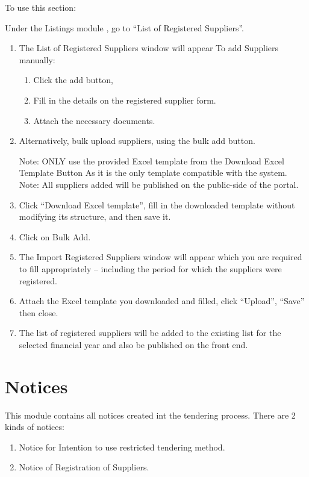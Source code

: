 \documentclass [12pt]{book}
\begin{document}
\begin{enumerate}
\begin{enumerate}
To use this section:

Under the Listings module , go to “List of Registered Suppliers”.
\begin{enumerate}
    \item The List of Registered Suppliers window will appear 
    To add Suppliers manually: 
    \begin{enumerate}
        \item Click the add button,
        \item Fill in the details on the registered supplier form.
        \item Attach the necessary documents.
    \end{enumerate}
    
    \item Alternatively, bulk upload suppliers, using the bulk add button.

    
    Note: ONLY use the provided Excel template from the Download Excel Template Button As it is the only template compatible with the system.\\
    
    Note: All suppliers added will be published on the public-side of the portal.\\
    
    \item Click “Download Excel template”, fill in the downloaded template without modifying its structure, and then save it.
    
    \item Click on Bulk Add. 
    \item The Import Registered Suppliers window will appear which you are required to fill appropriately – including the period for which the suppliers were registered.
    
    \item Attach the Excel template you downloaded and filled, click “Upload”, “Save” then close.
    
    \item The list of registered suppliers will be added to the existing list for the selected financial year and also be published on the front end.
    
 \end{enumerate}

 

\section{Notices}
This module contains all notices created int the tendering process. 
There are 2 kinds of notices:
\begin{enumerate}
\item	Notice for Intention to use restricted tendering method.
\item   Notice of Registration of Suppliers.
\end{enumerate}


\end{enumerate}
\end{enumerate}
\end{document}
